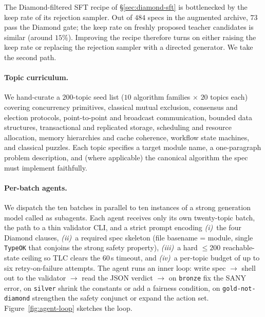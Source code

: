 \documentclass[11pt]{article}
\begin{document}
The Diamond-filtered SFT recipe of \S\ref{sec:diamond-sft} is bottlenecked
by the keep rate of its rejection sampler. Out of $484$ specs in the
augmented archive, $73$ pass the Diamond gate; the keep rate on freshly
proposed teacher candidates is similar (around $15\%$). Improving the
recipe therefore turns on either raising the keep rate or replacing the
rejection sampler with a directed generator. We take the second path.

\paragraph{Topic curriculum.} We hand-curate a $200$-topic seed list
($10$ algorithm families $\times$ $20$ topics each) covering
concurrency primitives, classical mutual exclusion, consensus and
election protocols, point-to-point and broadcast communication, bounded
data structures, transactional and replicated storage, scheduling and
resource allocation, memory hierarchies and cache coherence, workflow
state machines, and classical puzzles. Each topic specifies a target
module name, a one-paragraph problem description, and (where
applicable) the canonical algorithm the spec must implement faithfully.

\paragraph{Per-batch agents.} We dispatch the ten batches in parallel to
ten instances of a strong generation model called as subagents. Each
agent receives only its own twenty-topic batch, the path to a thin
validator CLI, and a strict prompt encoding \emph{(i)}~the four Diamond
clauses, \emph{(ii)}~a required spec skeleton (file basename = module,
single \texttt{TypeOK} that conjoins the strong safety property),
\emph{(iii)}~a hard $\le\!200$ reachable-state ceiling so TLC clears the
$60$\,s timeout, and \emph{(iv)}~a per-topic budget of up to six
retry-on-failure attempts. The agent runs an inner loop: write spec
$\to$ shell out to the validator $\to$ read the JSON verdict $\to$ on
\texttt{bronze} fix the SANY error, on \texttt{silver} shrink the
constants or add a fairness condition, on \texttt{gold-not-diamond}
strengthen the safety conjunct or expand the action set.
Figure~\ref{fig:agent-loop} sketches the loop.
\end{document}
